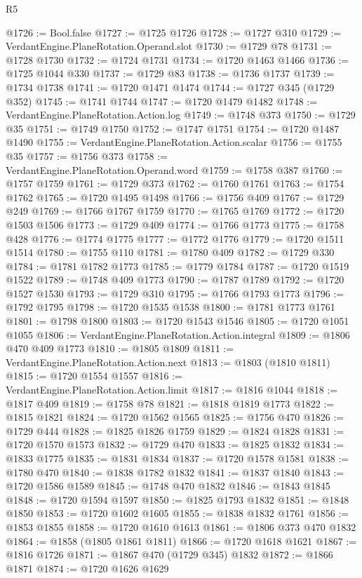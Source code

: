 \begin{lexlean}{R5}
\begin{coremodule}
@1726 := Bool.false
@1727 := @1725 @1726
@1728 := @1727 @310
@1729 := VerdantEngine.PlaneRotation.Operand.slot
@1730 := @1729 @78
@1731 := @1728 @1730
@1732 := @1724 @1731
@1734 := @1720 @1463 @1466
@1736 := @1725 @1044 @330
@1737 := @1729 @83
@1738 := @1736 @1737
@1739 := @1734 @1738
@1741 := @1720 @1471 @1474
@1744 := @1727 @345 (@1729 @352)
@1745 := @1741 @1744
@1747 := @1720 @1479 @1482
@1748 := VerdantEngine.PlaneRotation.Action.log
@1749 := @1748 @373
@1750 := @1729 @35
@1751 := @1749 @1750
@1752 := @1747 @1751
@1754 := @1720 @1487 @1490
@1755 := VerdantEngine.PlaneRotation.Action.scalar
@1756 := @1755 @35
@1757 := @1756 @373
@1758 := VerdantEngine.PlaneRotation.Operand.word
@1759 := @1758 @387
@1760 := @1757 @1759
@1761 := @1729 @373
@1762 := @1760 @1761
@1763 := @1754 @1762
@1765 := @1720 @1495 @1498
@1766 := @1756 @409
@1767 := @1729 @249
@1769 := @1766 @1767 @1759
@1770 := @1765 @1769
@1772 := @1720 @1503 @1506
@1773 := @1729 @409
@1774 := @1766 @1773
@1775 := @1758 @428
@1776 := @1774 @1775
@1777 := @1772 @1776
@1779 := @1720 @1511 @1514
@1780 := @1755 @110
@1781 := @1780 @409
@1782 := @1729 @330
@1784 := @1781 @1782 @1773
@1785 := @1779 @1784
@1787 := @1720 @1519 @1522
@1789 := @1748 @409 @1773
@1790 := @1787 @1789
@1792 := @1720 @1527 @1530
@1793 := @1729 @310
@1795 := @1766 @1793 @1773
@1796 := @1792 @1795
@1798 := @1720 @1535 @1538
@1800 := @1781 @1773 @1761
@1801 := @1798 @1800
@1803 := @1720 @1543 @1546
@1805 := @1720 @1051 @1055
@1806 := VerdantEngine.PlaneRotation.Action.integral
@1809 := @1806 @470 @409 @1773
@1810 := @1805 @1809
@1811 := VerdantEngine.PlaneRotation.Action.next
@1813 := @1803 (@1810 @1811)
@1815 := @1720 @1554 @1557
@1816 := VerdantEngine.PlaneRotation.Action.limit
@1817 := @1816 @1044
@1818 := @1817 @409
@1819 := @1758 @78
@1821 := @1818 @1819 @1773
@1822 := @1815 @1821
@1824 := @1720 @1562 @1565
@1825 := @1756 @470
@1826 := @1729 @444
@1828 := @1825 @1826 @1759
@1829 := @1824 @1828
@1831 := @1720 @1570 @1573
@1832 := @1729 @470
@1833 := @1825 @1832
@1834 := @1833 @1775
@1835 := @1831 @1834
@1837 := @1720 @1578 @1581
@1838 := @1780 @470
@1840 := @1838 @1782 @1832
@1841 := @1837 @1840
@1843 := @1720 @1586 @1589
@1845 := @1748 @470 @1832
@1846 := @1843 @1845
@1848 := @1720 @1594 @1597
@1850 := @1825 @1793 @1832
@1851 := @1848 @1850
@1853 := @1720 @1602 @1605
@1855 := @1838 @1832 @1761
@1856 := @1853 @1855
@1858 := @1720 @1610 @1613
@1861 := @1806 @373 @470 @1832
@1864 := @1858 (@1805 @1861 @1811)
@1866 := @1720 @1618 @1621
@1867 := @1816 @1726
@1871 := @1867 @470 (@1729 @345) @1832
@1872 := @1866 @1871
@1874 := @1720 @1626 @1629

\end{coremodule}
\end{lexlean}
